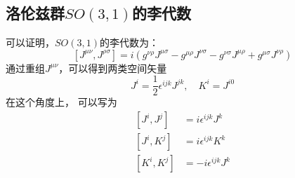 \subsection{洛伦兹群$SO(3,1)$的李代数}
可以证明，$SO(3,1)$的李代数为：
\begin{equation}\left[J^{\mu \nu}, J^{\rho \sigma}\right]=i\left(g^{\nu \rho} J^{\mu \sigma}-g^{\mu \rho} J^{\nu \sigma}-g^{\nu \sigma} J^{\mu \rho}+g^{\mu \sigma} J^{\nu \rho}\right)\end{equation}
通过重组$J^{\mu\nu}$，可以得到两类空间矢量
\begin{equation}J^{i}=\frac{1}{2} \epsilon^{i j k} J^{j k}, \quad K^{i}=J^{i 0}\end{equation}
在这个角度上， 可以写为
\begin{equation}\begin{aligned}
\left[J^{i}, J^{j}\right] &=i \epsilon^{i j k} J^{k} \\
\left[J^{i}, K^{j}\right] &=i \epsilon^{i j k} K^{k} \\
\left[K^{i}, K^{j}\right] &=-i \epsilon^{i j k} J^{k}
\end{aligned}\end{equation}
